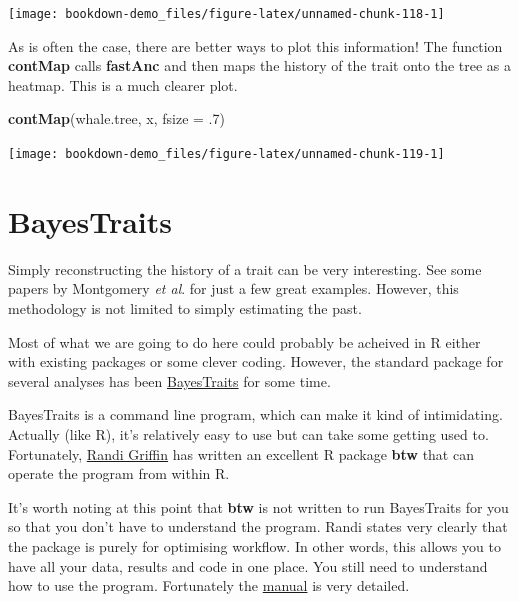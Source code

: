 \documentclass[
]{book}
\newenvironment{Shaded}{\begin{snugshade}}{\end{snugshade}}
\newcommand{\DataTypeTok}[1]{\textcolor[rgb]{0.13,0.29,0.53}{#1}}
\newcommand{\FloatTok}[1]{\textcolor[rgb]{0.00,0.00,0.81}{#1}}
\newcommand{\KeywordTok}[1]{\textcolor[rgb]{0.13,0.29,0.53}{\textbf{#1}}}
\newcommand{\NormalTok}[1]{#1}
\begin{document}
\begin{center}\texttt{[image: bookdown-demo\_files/figure-latex/unnamed-chunk-118-1]} \end{center}

As is often the case, there are better ways to plot this information! The function \textbf{contMap} calls \textbf{fastAnc} and then maps the history of the trait onto the tree as a heatmap. This is a much clearer plot.

\begin{Shaded}
\begin{Highlighting}[]
\KeywordTok{contMap}\NormalTok{(whale.tree, x, }\DataTypeTok{fsize =} \FloatTok{.7}\NormalTok{)}
\end{Highlighting}
\end{Shaded}

\begin{center}\texttt{[image: bookdown-demo\_files/figure-latex/unnamed-chunk-119-1]} \end{center}

\hypertarget{bayestraits}{%
\section{BayesTraits}\label{bayestraits}}

Simply reconstructing the history of a trait can be very interesting. See some papers by Montgomery \emph{et al}. \citetext{\citeyear{Montgomery10}; \citeyear{Montgomery13}} for just a few great examples. However, this methodology is not limited to simply estimating the past.

Most of what we are going to do here could probably be acheived in R either with existing packages or some clever coding. However, the standard package for several analyses has been \href{http://www.evolution.rdg.ac.uk/BayesTraitsV3.0.2/BayesTraitsV3.0.2.html}{BayesTraits} for some time.

BayesTraits is a command line program, which can make it kind of intimidating. Actually (like R), it's relatively easy to use but can take some getting used to. Fortunately, \href{https://www.randigriffin.com/}{Randi Griffin} has written an excellent R package \textbf{btw} that can operate the program from within R.

It's worth noting at this point that \textbf{btw} is not written to run BayesTraits for you so that you don't have to understand the program. Randi states very clearly that the package is purely for optimising workflow. In other words, this allows you to have all your data, results and code in one place. You still need to understand how to use the program. Fortunately the \href{http://www.evolution.rdg.ac.uk/BayesTraitsV3.0.2/Files/BayesTraitsV3.0.2Manual.pdf}{manual} is very detailed.
\end{document}
